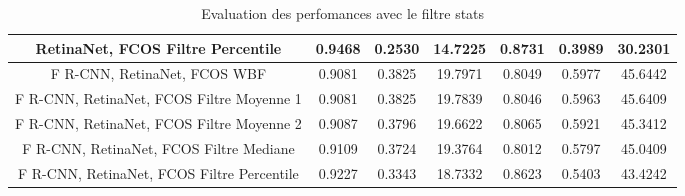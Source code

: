 \documentclass{article}
\begin{document}
\begin{table}[h!]
\begin{tabular}{|c||c|c|c||c|c|c|}
\hline
RetinaNet, FCOS Filtre Percentile & 0.9468 & 0.2530 & 14.7225 & 0.8731 & 0.3989 & 30.2301 \\ 
\hline
F R-CNN, RetinaNet, FCOS WBF & 0.9081 & 0.3825 & 19.7971 & 0.8049 & 0.5977 & 45.6442 \\ 
\hline
F R-CNN, RetinaNet, FCOS Filtre Moyenne 1 & 0.9081 & 0.3825 & 19.7839 & 0.8046 & 0.5963 & 45.6409 \\ 
\hline
F R-CNN, RetinaNet, FCOS Filtre Moyenne 2 & 0.9087 & 0.3796 & 19.6622 & 0.8065 & 0.5921 & 45.3412 \\ 
\hline
F R-CNN, RetinaNet, FCOS Filtre Mediane & 0.9109 & 0.3724 & 19.3764 & 0.8012 & 0.5797 & 45.0409 \\ 
\hline
F R-CNN, RetinaNet, FCOS Filtre Percentile & 0.9227 & 0.3343 & 18.7332 & 0.8623 & 0.5403 & 43.4242 \\ 
\hline
\end{tabular}
\caption{Evaluation des perfomances avec le filtre stats}
\label{table:data}
\end{table}
\end{document}
